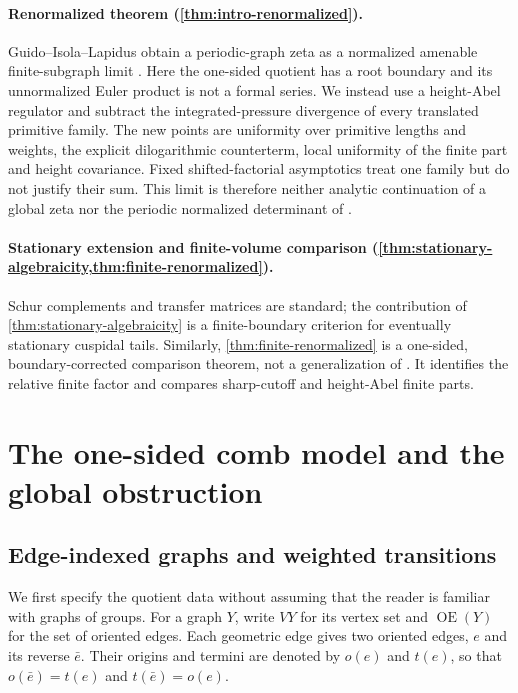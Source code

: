 \documentclass[11pt,reqno]{amsart}
\numberwithin{equation}{section}
\theoremstyle{definition}
\theoremstyle{remark}
\newcommand{\OrE}{\operatorname{OE}}
\begin{document}
\paragraph{Renormalized theorem (\cref{thm:intro-renormalized}).}
Guido--Isola--Lapidus obtain a periodic-graph zeta as a normalized amenable
finite-subgraph limit \cite{GuidoIsolaLapidus2008Approximation}.  Here the
one-sided quotient has a root boundary and its unnormalized Euler product is
not a formal series.  We instead use a height-Abel regulator and subtract the
integrated-pressure divergence of every translated primitive family.  The new
points are uniformity over primitive lengths and weights, the explicit
dilogarithmic counterterm, local uniformity of the finite part and height
covariance.  Fixed shifted-factorial asymptotics \cite{McIntosh1999} treat one
family but do not justify their sum.  This limit is therefore neither analytic
continuation of a global zeta nor the periodic normalized determinant of
\cite{GuidoIsolaLapidus2008Periodic,GuidoIsolaLapidus2008Approximation}.

\paragraph{Stationary extension and finite-volume comparison
(\cref{thm:stationary-algebraicity,thm:finite-renormalized}).}
Schur complements and transfer matrices are standard; the contribution of
\cref{thm:stationary-algebraicity} is a finite-boundary criterion for
eventually stationary cuspidal tails.  Similarly,
\cref{thm:finite-renormalized} is a one-sided, boundary-corrected comparison
theorem, not a generalization of \cite{GuidoIsolaLapidus2008Approximation}.
It identifies the relative finite factor and compares sharp-cutoff and
height-Abel finite parts.

\section{The one-sided comb model and the global obstruction}
\label{sec:prelim}

\subsection{Edge-indexed graphs and weighted transitions}

We first specify the quotient data without assuming that the reader is
familiar with graphs of groups.  For a graph $Y$, write $VY$ for its vertex
set and $\OrE(Y)$ for the set of oriented edges.  Each geometric edge gives
two oriented edges, $e$ and its reverse $\bar e$.  Their origins and termini
are denoted by $o(e)$ and $t(e)$, so that
$o(\bar e)=t(e)$ and $t(\bar e)=o(e)$.
\end{document}
